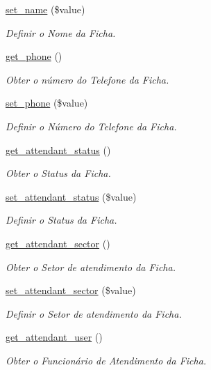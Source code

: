 \begin{DoxyCompactItemize}
\hyperlink{class_class_ficha_a53e29da8f1da63502f3e13091fcb74e5}{set\+\_\+name} (\$value)
\begin{DoxyCompactList}\small\item\em Definir o Nome da Ficha. \end{DoxyCompactList}\item 
\hyperlink{class_class_ficha_a34c85b5b59e155044c316cb139684934}{get\+\_\+phone} ()
\begin{DoxyCompactList}\small\item\em Obter o número do Telefone da Ficha. \end{DoxyCompactList}\item 
\hyperlink{class_class_ficha_a62e5af292b272f5b6ffd4606bafe7104}{set\+\_\+phone} (\$value)
\begin{DoxyCompactList}\small\item\em Definir o Número do Telefone da Ficha. \end{DoxyCompactList}\item 
\hyperlink{class_class_ficha_af0d76aee9d27ee2d61843cd94825ee88}{get\+\_\+attendant\+\_\+status} ()
\begin{DoxyCompactList}\small\item\em Obter o Status da Ficha. \end{DoxyCompactList}\item 
\hyperlink{class_class_ficha_a0d789f7b74b448e59b675b7860f614a4}{set\+\_\+attendant\+\_\+status} (\$value)
\begin{DoxyCompactList}\small\item\em Definir o Status da Ficha. \end{DoxyCompactList}\item 
\hyperlink{class_class_ficha_a85465890c6a10587eabeac707aa3caf0}{get\+\_\+attendant\+\_\+sector} ()
\begin{DoxyCompactList}\small\item\em Obter o Setor de atendimento da Ficha. \end{DoxyCompactList}\item 
\hyperlink{class_class_ficha_ab2f464eda89675298cebd70c29a5fe63}{set\+\_\+attendant\+\_\+sector} (\$value)
\begin{DoxyCompactList}\small\item\em Definir o Setor de atendimento da Ficha. \end{DoxyCompactList}\item 
\hyperlink{class_class_ficha_a29c1686664048f7cd94c207fde913589}{get\+\_\+attendant\+\_\+user} ()
\begin{DoxyCompactList}\small\item\em Obter o Funcionário de Atendimento da Ficha. \end{DoxyCompactList}\item 

\end{DoxyCompactItemize}

